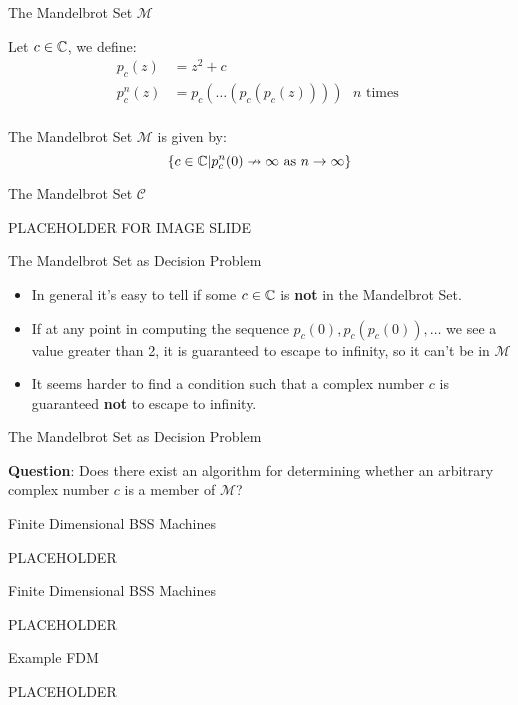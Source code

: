 \documentclass[c]{beamer}
\begin{document}
\begin{frame}{The Mandelbrot Set $\mathcal{M}$}
  
  \begin{definition}

    Let $c \in \mathbb{C}$, we define:
    \begin{align*}
      p_c(z) &= z^2 + c\\
      p_c^n(z) &= p_c(\ldots(p_c(p_c(z)))) \text{ $n$ times }\\
    \end{align*}
    
    \vspace{-\baselineskip}
    
    The Mandelbrot Set $\mathcal{M}$ is given by:
    $$\{c \in \mathbb{C} |p_c^n(0) \nrightarrow \infty \text{ as } n \rightarrow \infty\}$$
  \end{definition}

\end{frame}

\begin{frame}{The Mandelbrot Set $\mathcal{C}$}

  PLACEHOLDER FOR IMAGE SLIDE
  
\end{frame}

\begin{frame}{The Mandelbrot Set as Decision Problem}
  
  \begin{itemize}
  \item In general it's easy to tell if some $c \in \mathbb{C}$ is
    \textbf{not} in the Mandelbrot Set.\pause
  \item If at any point in computing the sequence $p_c(0),
    p_c(p_c(0)), \ldots$ we see a value greater than 2, it is
    guaranteed to escape to infinity, so it can't be in
    $\mathcal{M}$\pause
  \item It seems harder to find a condition such that a complex number
    $c$ is guaranteed \textbf{not} to escape to infinity.
  \end{itemize}
\end{frame}

\begin{frame}{The Mandelbrot Set as Decision Problem}
  
  \textbf{Question}: Does there exist an algorithm for determining
  whether an arbitrary complex number $c$ is a member of
  $\mathcal{M}$?
  
\end{frame}

\begin{frame}{Finite Dimensional BSS Machines}

  PLACEHOLDER
  
\end{frame}

\begin{frame}{Finite Dimensional BSS Machines}

  PLACEHOLDER
  
\end{frame}

\begin{frame}{Example FDM}
   
  PLACEHOLDER

\end{frame}
\end{document}
